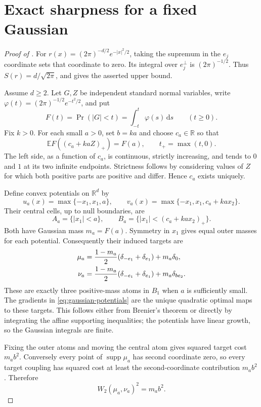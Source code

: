 \documentclass[11pt]{article}
\numberwithin{equation}{section}
\theoremstyle{remark}
\newcommand{\R}{\mathbb R}
\newcommand{\E}{\mathbb E}
\newcommand{\supp}{\operatorname{supp}}
\newcommand{\dd}{\,\mathrm d}
\begin{document}
\section{Exact sharpness for a fixed Gaussian}\label{sec:gaussian}
\begin{proof}[Proof of ]
For $r(x)=(2\pi)^{-d/2}e^{-|x|^2/2}$, taking the supremum in the $e_j$ coordinate sets that coordinate to zero. Its integral over $e_j^\perp$ is $(2\pi)^{-1/2}$. Thus $S(r)=d/\sqrt{2\pi}$, and  gives the asserted upper bound.

Assume $d\ge2$. Let $G,Z$ be independent standard normal variables, write $\varphi(t)=(2\pi)^{-1/2}e^{-t^2/2}$, and put
\[
 F(t)=\Pr(|G|<t)=\int_{-t}^t\varphi(s)\dd s\qquad(t\ge0).
\]
Fix $k>0$. For each small $a>0$, set $b=ka$ and choose $c_a\in\R$ so that
\begin{equation}\label{eq:ca-definition}
 \E F((c_a+kaZ)_+)=F(a),\qquad t_+=\max(t,0).
\end{equation}
The left side, as a function of $c_a$, is continuous, strictly increasing, and tends to $0$ and $1$ at its two infinite endpoints. Strictness follows by considering values of $Z$ for which both positive parts are positive and differ. Hence $c_a$ exists uniquely.

Define convex potentials on $\R^d$ by
\begin{equation}\label{eq:gaussian-potentials}
 u_a(x)=\max\{-x_1,x_1,a\},\qquad
 v_a(x)=\max\{-x_1,x_1,c_a+ka x_2\}.
\end{equation}
Their central cells, up to null boundaries, are
\[
 A_a=\{|x_1|<a\},\qquad
 B_a=\{|x_1|<(c_a+ka x_2)_+\}.
\]
Both have Gaussian mass $m_a=F(a)$. Symmetry in $x_1$ gives equal outer masses for each potential. Consequently their induced targets are
\begin{align}
 \mu_a&=\frac{1-m_a}{2}(\delta_{-e_1}+\delta_{e_1})+m_a\delta_0,\notag\\
 \nu_a&=\frac{1-m_a}{2}(\delta_{-e_1}+\delta_{e_1})+m_a\delta_{be_2}.
 \label{eq:gaussian-targets}
\end{align}
These are exactly three positive-mass atoms in $B_1$ when $a$ is sufficiently small. The gradients in \eqref{eq:gaussian-potentials} are the unique quadratic optimal maps to these targets. This follows either from Brenier's theorem or directly by integrating the affine supporting inequalities; the potentials have linear growth, so the Gaussian integrals are finite.

Fixing the outer atoms and moving the central atom gives squared target cost $m_ab^2$. Conversely every point of $\supp\mu_a$ has second coordinate zero, so every target coupling has squared cost at least the second-coordinate contribution $m_ab^2$. Therefore
\begin{equation}\label{eq:gaussian-w2}
 W_2(\mu_a,\nu_a)^2=m_ab^2.
\end{equation}


\end{proof}
\end{document}
